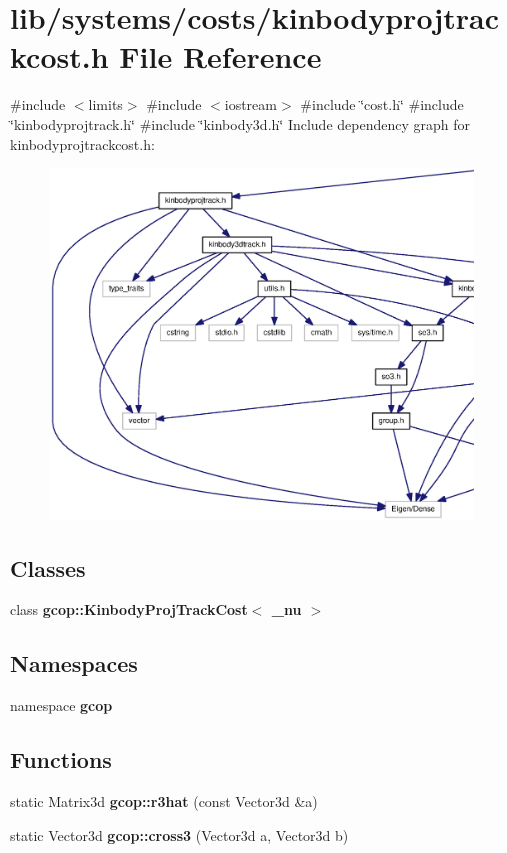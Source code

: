 \section{lib/systems/costs/kinbodyprojtrackcost.h \-File \-Reference}
\label{kinbodyprojtrackcost_8h}
{\ttfamily \#include $<$limits$>$}\*
{\ttfamily \#include $<$iostream$>$}\*
{\ttfamily \#include \char`\"{}cost.\-h\char`\"{}}\*
{\ttfamily \#include \char`\"{}kinbodyprojtrack.\-h\char`\"{}}\*
{\ttfamily \#include \char`\"{}kinbody3d.\-h\char`\"{}}\*
\-Include dependency graph for kinbodyprojtrackcost.\-h\-:\nopagebreak
\begin{figure}[H]
\begin{center}
\leavevmode
\includegraphics[width=350pt]{kinbodyprojtrackcost_8h__incl}
\end{center}
\end{figure}
\subsection*{\-Classes}
\begin{DoxyCompactItemize}
\item 
class {\bf gcop\-::\-Kinbody\-Proj\-Track\-Cost$<$ \-\_\-nu $>$}
\end{DoxyCompactItemize}
\subsection*{\-Namespaces}
\begin{DoxyCompactItemize}
\item 
namespace {\bf gcop}
\end{DoxyCompactItemize}
\subsection*{\-Functions}
\begin{DoxyCompactItemize}
\item 
static \-Matrix3d {\bf gcop\-::r3hat} (const \-Vector3d \&a)
\item 
static \-Vector3d {\bf gcop\-::cross3} (\-Vector3d a, \-Vector3d b)
\end{DoxyCompactItemize}
